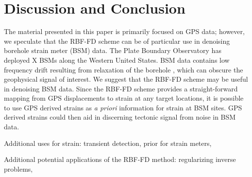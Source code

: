 \documentclass[10pt,a4paper]{article}
\begin{document}
\section{Discussion and Conclusion}\label{sec:Discussion}











The material presented in this paper is primarily focused on GPS data; however, we speculate that the RBF-FD scheme can be of particular use in denoising borehole strain meter (BSM) data.  The Plate Boundary Observatory has deployed X BSMs along the Western United States.  BSM data contains low frequency drift resulting from relaxation of the borehole \citep{Gladwin1987}, which can obscure the geophysical signal of interest.  We suggest that the RBF-FD scheme may be useful in denoising BSM data.  Since the RBF-FD scheme provides a straight-forward mapping from GPS displacements to strain at any target locations, it is possible to use GPS derived strains as \textit{a priori} information for strain at BSM sites. GPS derived strains could then aid in discerning tectonic signal from noise in BSM data.

Additional uses for strain: transient detection, prior for strain meters,  

Additional potential applications of the RBF-FD method: regularizing inverse problems, 



  
 
\end{document}
